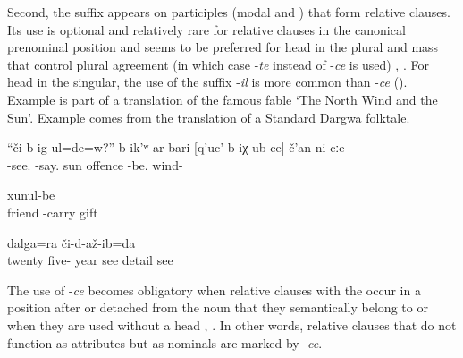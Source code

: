 Second, the suffix appears on participles (modal and ) that form relative clauses. Its use is optional and relatively rare for relative clauses in the canonical prenominal position and seems to be preferred for head  in the plural and mass  that control plural agreement (in which case -\textit{te} instead of -\textit{ce} is used) , . For head  in the singular, the use of the suffix -\textit{il} is more common than -\textit{ce} (). Example  is part of a translation of the famous fable `The North Wind and the Sun’. Example  comes from the translation of a Standard Dargwa folktale. 

\begin{exe}

\ex	\label{Do you see?'' said the sun to the offended wind.}
\gll ``či-b-ig-ul=de=w?''	b-ik'ʷ-ar	bari	[q'uc'	b-iχ-ub-ce]	č'an-ni-cːe\\
-see.	-say.	sun	offence	-be.	wind-\\
\glt {}

	\ex	\label{ex:the gifts that the friends had brought to him@16a}
		xunul-be\\
		friend		-carry	gift\\
	\glt	{}
	
			\ex	\label{ex:I saw the details that I did not see for 25 years}
		dalga=ra	či-d-až-ib=da\\
		twenty	five-	year	see 	detail	see\\
	\glt	{}
\end{exe}

The use of -\textit{ce} becomes obligatory when relative clauses with the  occur in a position after or detached from the noun that they semantically belong to  or when they are used without a head , . In other words, relative clauses that do not function as attributes but as nominals are marked by -\textit{ce}.

